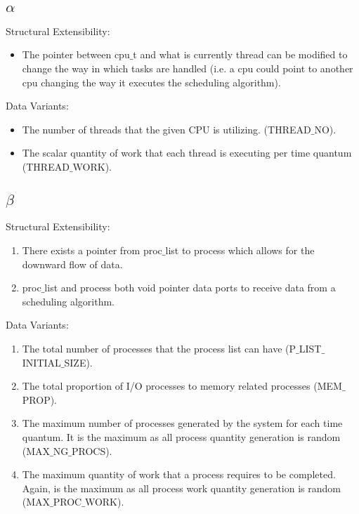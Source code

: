 \documentclass[acmsmall]{acmart}
\begin{document}
\begin{multicols}{2}
  \subsection{$\alpha$}
    Structural Extensibility:
    \begin{itemize}
      \item The pointer between cpu$\_$t and what is currently thread can be
        modified to change the way in which tasks are handled (i.e. a cpu could
        point to another cpu changing the way it executes the scheduling
        algorithm).
    \end{itemize}
    Data Variants:
    \begin{itemize}
      \item The number of threads that the given CPU is utilizing.
        (THREAD$\_$NO).
      \item The scalar quantity of work that each thread is executing per time
        quantum (THREAD$\_$WORK).
    \end{itemize}
  \subsection{$\beta$}
    Structural Extensibility:
    \begin{enumerate}
      \item There exists a pointer from proc$\_$list to process which allows for
        the downward flow of data.
      \item proc$\_$list and process both void pointer data ports to receive
        data from a scheduling algorithm.
    \end{enumerate}
    Data Variants:
    \begin{enumerate}
      \item The total number of processes that the process list can have
        (P$\_$LIST$\_$INITIAL$\_$SIZE).
      \item The total proportion of I/O processes to memory related processes
        (MEM$\_$PROP).
      \item The maximum number of processes generated by the system for each
        time quantum. It is the maximum as all process quantity generation is
        random (MAX$\_$NG$\_$PROCS).
      \item The maximum quantity of work that a process requires to be
        completed. Again, is the maximum as all process work quantity generation
        is random (MAX$\_$PROC$\_$WORK).
    \end{enumerate}

\end{multicols}
\end{document}
